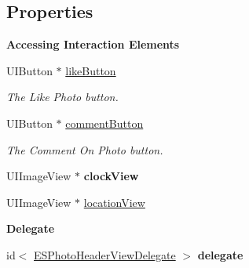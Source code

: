 \subsection*{Properties}
\begin{Indent}{\bf Accessing Interaction Elements}\par
\begin{DoxyCompactItemize}
\item 
\hypertarget{interface_e_s_photo_header_view_ae570fc628accd1669c0739ee244c464d}{}U\+I\+Button $\ast$ \hyperlink{interface_e_s_photo_header_view_ae570fc628accd1669c0739ee244c464d}{like\+Button}\label{interface_e_s_photo_header_view_ae570fc628accd1669c0739ee244c464d}

\begin{DoxyCompactList}\small\item\em The Like Photo button. \end{DoxyCompactList}\item 
\hypertarget{interface_e_s_photo_header_view_a85e1588de6b3b7fcd226deea96057b05}{}U\+I\+Button $\ast$ \hyperlink{interface_e_s_photo_header_view_a85e1588de6b3b7fcd226deea96057b05}{comment\+Button}\label{interface_e_s_photo_header_view_a85e1588de6b3b7fcd226deea96057b05}

\begin{DoxyCompactList}\small\item\em The Comment On Photo button. \end{DoxyCompactList}\item 
\hypertarget{interface_e_s_photo_header_view_a4a3c22bff31db471d8534b605acf64ac}{}U\+I\+Image\+View $\ast$ {\bfseries clock\+View}\label{interface_e_s_photo_header_view_a4a3c22bff31db471d8534b605acf64ac}

\item 
U\+I\+Image\+View $\ast$ \hyperlink{interface_e_s_photo_header_view_aaf1493f6259e310bc78058308b68e068}{location\+View}
\end{DoxyCompactItemize}
\end{Indent}
\begin{Indent}{\bf Delegate}\par
\begin{DoxyCompactItemize}
\item 
\hypertarget{interface_e_s_photo_header_view_a262de6b1046f4970acec2e80f8bb9cb6}{}id$<$ \hyperlink{protocol_e_s_photo_header_view_delegate-p}{E\+S\+Photo\+Header\+View\+Delegate} $>$ {\bfseries delegate}\label{interface_e_s_photo_header_view_a262de6b1046f4970acec2e80f8bb9cb6}

\end{DoxyCompactItemize}
\end{Indent}
